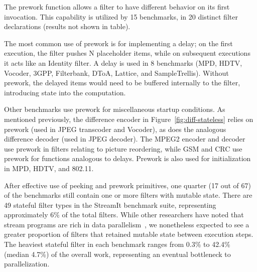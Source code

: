   The prework
function allows a filter to have different behavior on its first
invocation.  This capability is utilized by 15 benchmarks, in 20
distinct filter declarations (results not shown in table).

The most common use of prework is for implementing a delay; on the
first execution, the filter pushes N placeholder items, while on
subsequent executions it acts like an Identity filter.  A delay is
used in 8 benchmarks (MPD, HDTV, Vocoder, 3GPP, Filterbank, DToA,
Lattice, and SampleTrellis).  Without prework, the delayed items would
need to be buffered internally to the filter, introducing state into
the computation.

Other benchmarks use prework for miscellaneous startup conditions.  As
mentioned previously, the difference encoder in
Figure~\ref{fig:diff-stateless} relies on prework (used in JPEG
transcoder and Vocoder), as does the analogous difference decoder
(used in JPEG decoder).  The MPEG2 encoder and decoder use prework in
filters relating to picture reordering, while GSM and CRC use prework
for functions analogous to delays.  Prework is also used for
initialization in MPD, HDTV, and 802.11.

  After effective use
of peeking and prework primitives, one quarter (17 out of 67) of the
benchmarks still contain one or more filters with mutable state.
There are 49 stateful filter types in the StreamIt benchmark suite,
representing approximately 6\% of the total filters.  While other
researchers have noted that stream programs are rich in data
parallelism~\cite{imagine03ieee}, we nonetheless expected to see a
greater proportion of filters that retained mutable state between
execution steps.  The heaviest stateful filter in each benchmark
ranges from 0.3\% to 42.4\% (median 4.7\%) of the overall work,
representing an eventual bottleneck to parallelization.

